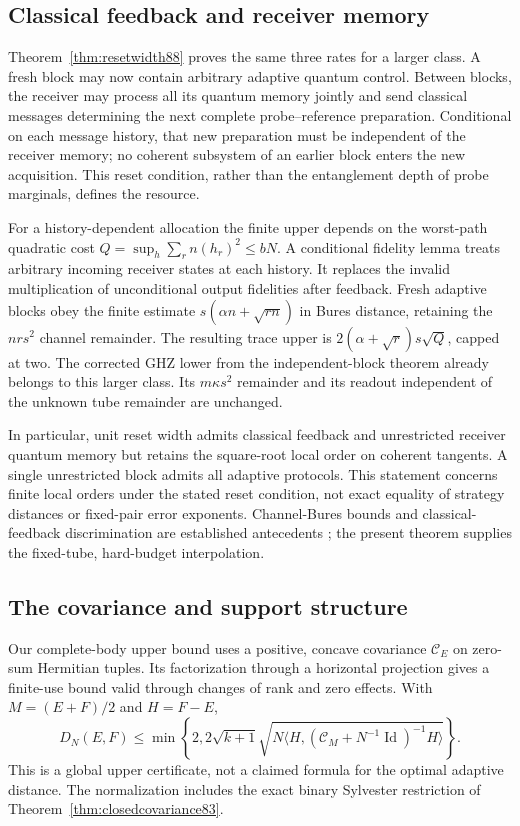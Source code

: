\subsection{Classical feedback and receiver memory}
Theorem~\ref{thm:resetwidth88} proves the same three rates for a
larger class.  A fresh block may now contain arbitrary adaptive
quantum control.  Between blocks, the receiver may process all its
quantum memory jointly and send classical messages determining the
next complete probe--reference preparation.  Conditional on each
message history, that new preparation must be independent of the
receiver memory; no coherent subsystem of an earlier block enters
the new acquisition.  This reset condition, rather than the
entanglement depth of probe marginals, defines the resource.

For a history-dependent allocation the finite upper depends on the
worst-path quadratic cost $Q=\sup_h\sum_r n(h_r)^2\le bN$.
A conditional fidelity lemma treats arbitrary incoming receiver
states at each history.  It replaces the invalid multiplication of
unconditional output fidelities after feedback.  Fresh adaptive
blocks obey the finite estimate $s(\alpha n+\sqrt{rn})$ in Bures
distance, retaining the $nrs^2$ channel remainder.  The resulting
trace upper is $2(\alpha+\sqrt r)s\sqrt Q$, capped at two.
The corrected GHZ lower from the independent-block theorem already
belongs to this larger class.  Its $m\kappa s^2$ remainder and its
readout independent of the unknown tube remainder are unchanged.

In particular, unit reset width admits classical feedback and
unrestricted receiver quantum memory but retains the square-root
local order on coherent tangents.  A single unrestricted block
admits all adaptive protocols.  This statement concerns finite local
orders under the stated reset condition, not exact equality of
strategy distances or fixed-pair error exponents.  Channel-Bures
bounds and classical-feedback discrimination are established
antecedents \cite{HMNW88,SHW87}; the present theorem supplies the
fixed-tube, hard-budget interpolation.

\subsection{The covariance and support structure}
Our complete-body upper bound uses a positive, concave covariance
$\mathcal C_E$ on zero-sum Hermitian tuples.  Its factorization through
a horizontal projection gives a finite-use bound valid through changes
of rank and zero effects.  With $M=(E+F)/2$ and $H=F-E$,
\begin{equation}\label{eq:frontupper84}
 D_N(E,F)\le\min\left\{2,2\sqrt{k+1}
  \sqrt{N\langle H,(\mathcal C_M+N^{-1}\operatorname{Id})^{-1}H\rangle}
                              \right\}.
\end{equation}
This is a global upper certificate, not a claimed formula for the
optimal adaptive distance.  The normalization includes the exact
binary Sylvester restriction of Theorem~\ref{thm:closedcovariance83}.

